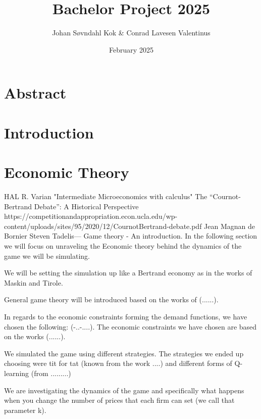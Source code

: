 \documentclass{article}
\title{Bachelor Project 2025}
\author{Johan Søvndahl Kok & Conrad Lavesen Valentinus}
\date{February 2025}
\begin{document}
\maketitle
\newpage
\tableofcontents
\newpage

\section{Abstract}


\section{Introduction}

\section{Economic Theory}
HAL R. Varian "Intermediate Microeconomics with calculus"
\newline 
The “Cournot-Bertrand Debate”:
A Historical Perspective 
https://competitionandappropriation.econ.ucla.edu/wp-content/uploads/sites/95/2020/12/CournotBertrand-debate.pdf
Jean Magnan de Bornier 
\newline
Steven Tadelis--- Game theory -  An introduction.
\newline
In the following section we will focus on unraveling the Economic theory behind the dynamics of the game we will be simulating. 

We will be setting the simulation up like a Bertrand economy as in the works of Maskin and Tirole.

General game theory will be introduced based on the works of (......).

In regards to the economic constraints forming the demand functions, we have chosen the following: (-..-....). The economic constraints we have chosen are based on the works (......).

We simulated the game using different strategies. The strategies we ended up choosing were tit for tat (known from the work ....) and different forms of Q-learning (from .........)


We are investigating the dynamics of the game and specifically what happens when you change the number of prices that each firm can set (we call that parameter k).
\end{document}
